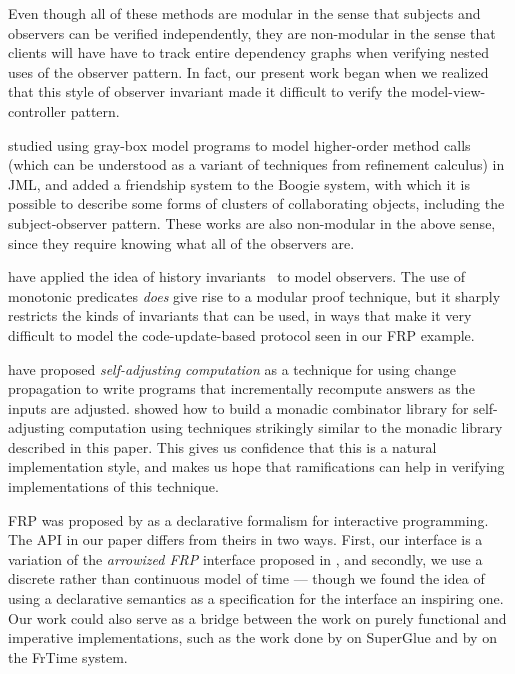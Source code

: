 \documentclass[natbib]{sigplanconf}
\begin{document}
Even though all of these methods are modular in the sense that
subjects and observers can be verified independently, they are
non-modular in the sense that clients will have have to track entire
dependency graphs when verifying nested uses of the observer
pattern. In fact, our present work began when we realized that this
style of observer invariant made it difficult to verify the
model-view-controller pattern.

\citet{shaner-leavens-naumann} studied using gray-box model programs
to model higher-order method calls (which can be understood as a
variant of techniques from refinement calculus) in JML, and
\citet{barnett-naumann} added a friendship system to the Boogie
system, with which it is possible to describe some forms of clusters of
collaborating objects, including the subject-observer pattern. 
These works are also
non-modular in the above sense, since they require 
knowing what all of the observers are.


\citet{history-invariants} have applied the idea of
history invariants~\cite{liskov-wing} to model observers. The use of
monotonic predicates \emph{does} give rise to a modular
proof technique, but it sharply restricts the kinds of invariants that
can be used, in ways that make it very difficult to model the
code-update-based protocol seen in our FRP example. 

\citet{self-adjusting} have proposed \emph{self-adjusting computation}
as a technique for using change propagation to write programs that
incrementally recompute answers as the inputs are
adjusted. \citet{carlsson} showed how to build a monadic combinator library for
self-adjusting computation using techniques strikingly similar
to the monadic library described in this paper. This gives us 
confidence that this is a natural implementation style, and makes us 
hope that ramifications can help in verifying implementations of this
technique.

FRP was proposed by \citet{frp} as a declarative formalism for
interactive programming. The API in our paper differs from theirs in
two ways. First, our interface is a variation of the \emph{arrowized
  FRP} interface proposed in \citet{afrp}, and secondly, we use a
discrete rather than continuous model of time --- though we found the
idea of using a declarative semantics as a specification for the
interface an inspiring one.  Our work could also serve as a bridge
between the work on purely functional and imperative implementations,
such as the work done by \citet{superglue} on SuperGlue and by
\citet{frtime} on the FrTime system.
\end{document}

